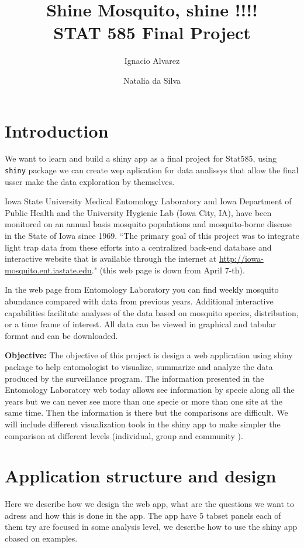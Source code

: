 \documentclass{article}\usepackage[]{graphicx}\usepackage[]{color}
\title{Shine Mosquito, shine !!!!\\
STAT 585 Final Project}
\author{ Ignacio Alvarez \and Natalia da Silva}
\begin{document}
\maketitle


\section{Introduction}
We want to learn and build a shiny app as a final project for Stat585, using {\tt shiny} package we can create wep aplication for data analissys that allow the final usser make the data exploration by themselves. 

Iowa State University Medical Entomology Laboratory and Iowa Department of Public Health and the University Hygienic Lab (Iowa City, IA), have been monitored on an annual basis mosquito populations and mosquito-borne disease in the State of Iowa since 1969. ``The primary goal of this project was to integrate light trap data from these efforts into a centralized back-end database and interactive website that is available through the internet at \href{ http://iowa-mosquito.ent.iastate.edu}{http://iowa-mosquito.ent.iastate.edu}." (this web page is down from April 7-th).

In the web page from Entomology Laboratory you can find weekly mosquito abundance compared with data from previous years. Additional interactive capabilities facilitate analyses of the data based on mosquito species, distribution, or a time frame of interest. All data can be viewed in graphical and tabular format and can be downloaded.

\textbf{Objective:} The objective of this project is design a web application using shiny package to help entomologist to visualize, summarize and analyze the data produced by the surveillance program. The information presented in the Entomology Laboratory web today allows see information by specie along all the years  but we can never see more than one specie or more than one site at the same time. Then the information is there but the comparisons are difficult. We will include different visualization tools in the shiny app to make simpler the comparison at different levels (individual, group and community ). 


\section{Application structure and design}
Here we describe how we design the web app, what are the questions we want to adress and how this is done in the app. The app have 5 tabset panels each of them try are focused in some analysis level, we describe how to use the shiny app cbased on examples. 
\end{document}
